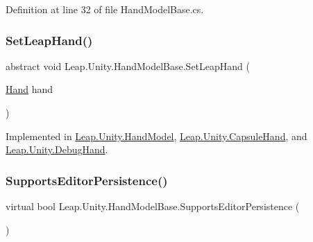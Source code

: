 Definition at line 32 of file Hand\+Model\+Base.\+cs.

\mbox{\label{class_leap_1_1_unity_1_1_hand_model_base_ab8830cac842482ed7d1045beeb54e98c}} 
\subsubsection{\texorpdfstring{SetLeapHand()}{SetLeapHand()}}
{\footnotesize\ttfamily abstract void Leap.\+Unity.\+Hand\+Model\+Base.\+Set\+Leap\+Hand (\begin{DoxyParamCaption}\item[{\mbox{\hyperlink{class_leap_1_1_hand}{Hand}}}]{hand }\end{DoxyParamCaption})\hspace{0.3cm}{\ttfamily [pure virtual]}}



Implemented in \mbox{\hyperlink{class_leap_1_1_unity_1_1_hand_model_a73f417c17d35db37192c164193010ba0}{Leap.\+Unity.\+Hand\+Model}}, \mbox{\hyperlink{class_leap_1_1_unity_1_1_capsule_hand_a36435c4a198b8fcf38560846141c15a5}{Leap.\+Unity.\+Capsule\+Hand}}, and \mbox{\hyperlink{class_leap_1_1_unity_1_1_debug_hand_a22cf0421f70d6ab4129c169116d0d83c}{Leap.\+Unity.\+Debug\+Hand}}.

\mbox{\label{class_leap_1_1_unity_1_1_hand_model_base_acd4789523584dd7d240e1d426b4d321c}} 
\subsubsection{\texorpdfstring{SupportsEditorPersistence()}{SupportsEditorPersistence()}}
{\footnotesize\ttfamily virtual bool Leap.\+Unity.\+Hand\+Model\+Base.\+Supports\+Editor\+Persistence (\begin{DoxyParamCaption}{ }\end{DoxyParamCaption})\hspace{0.3cm}{\ttfamily [virtual]}}




